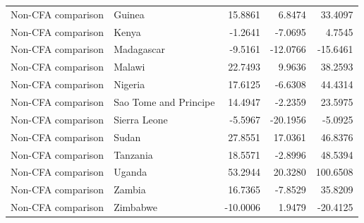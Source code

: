 \begin{table}
\begin{tabular}[t]{llrrr}
Non-CFA comparison & Guinea & 15.8861 & 6.8474 & 33.4097\\
Non-CFA comparison & Kenya & -1.2641 & -7.0695 & 4.7545\\
\addlinespace
Non-CFA comparison & Madagascar & -9.5161 & -12.0766 & -15.6461\\
Non-CFA comparison & Malawi & 22.7493 & 9.9636 & 38.2593\\
Non-CFA comparison & Nigeria & 17.6125 & -6.6308 & 44.4314\\
Non-CFA comparison & Sao Tome and Principe & 14.4947 & -2.2359 & 23.5975\\
Non-CFA comparison & Sierra Leone & -5.5967 & -20.1956 & -5.0925\\
\addlinespace
Non-CFA comparison & Sudan & 27.8551 & 17.0361 & 46.8376\\
Non-CFA comparison & Tanzania & 18.5571 & -2.8996 & 48.5394\\
Non-CFA comparison & Uganda & 53.2944 & 20.3280 & 100.6508\\
Non-CFA comparison & Zambia & 16.7365 & -7.8529 & 35.8209\\
Non-CFA comparison & Zimbabwe & -10.0006 & 1.9479 & -20.4125\\
\bottomrule
\end{tabular}
\end{table}